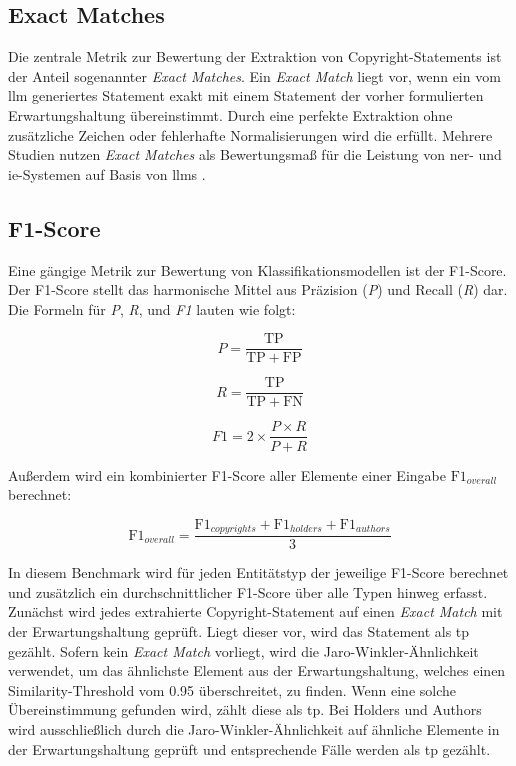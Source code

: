 \subsection{Exact Matches}
Die zentrale Metrik zur Bewertung der Extraktion von Copyright-Statements ist der Anteil sogenannter \textit{Exact Matches}.
Ein \textit{Exact Match} liegt vor, wenn ein vom \gls{llm} generiertes Statement exakt mit einem Statement der vorher formulierten Erwartungshaltung übereinstimmt.
Durch eine perfekte Extraktion ohne zusätzliche Zeichen oder fehlerhafte Normalisierungen wird die  erfüllt.
Mehrere Studien nutzen \textit{Exact Matches} als Bewertungsmaß für die Leistung von \gls{ner}- und \gls{ie}-Systemen auf Basis von \glspl{llm} \autocite{dunn_structured_2022} \autocite{hu_improving_2024}.

\subsection{F1-Score}
Eine gängige Metrik zur Bewertung von Klassifikationsmodellen ist der F1-Score\autocite{noauthor_f-score_2025}.
Der F1-Score stellt das harmonische Mittel aus Präzision (\textit{P}) und Recall (\textit{R}) dar.
Die Formeln für \textit{P}, \textit{R}, und \textit{F1} lauten wie folgt:

\[
 P = \frac{\mathrm{TP}}{\mathrm{TP} + \mathrm{FP}}
\]

\[
 R = \frac{\mathrm{TP}}{\mathrm{TP} + \mathrm{FN}}
\]

\[
 F1 = 2 \times \frac{P \times R}{P + R}
\]

Außerdem wird ein kombinierter F1-Score aller Elemente einer Eingabe $\mathrm{F1}_{overall}$ berechnet:

\[
 \mathrm{F1}_{overall} = \frac{\mathrm{F1}_{copyrights} + \mathrm{F1}_{holders} + \mathrm{F1}_{authors}}{3}
\]

In diesem Benchmark wird für jeden Entitätstyp der jeweilige F1-Score berechnet und zusätzlich ein durchschnittlicher F1-Score über alle Typen hinweg erfasst.
Zunächst wird jedes extrahierte Copyright-Statement auf einen \textit{Exact Match} mit der Erwartungshaltung geprüft.
Liegt dieser vor, wird das Statement als \gls{tp} gezählt.
Sofern kein \textit{Exact Match} vorliegt, wird die Jaro-Winkler-Ähnlichkeit \autocite{noauthor_jarowinkler_nodate} verwendet, um das ähnlichste Element aus der Erwartungshaltung, welches einen Similarity-Threshold vom \num{0,95} überschreitet, zu finden.
Wenn eine solche Übereinstimmung gefunden wird, zählt diese als \gls{tp}.
Bei Holders und Authors wird ausschließlich durch die Jaro-Winkler-Ähnlichkeit auf ähnliche Elemente in der Erwartungshaltung geprüft und entsprechende Fälle werden als \gls{tp} gezählt.

